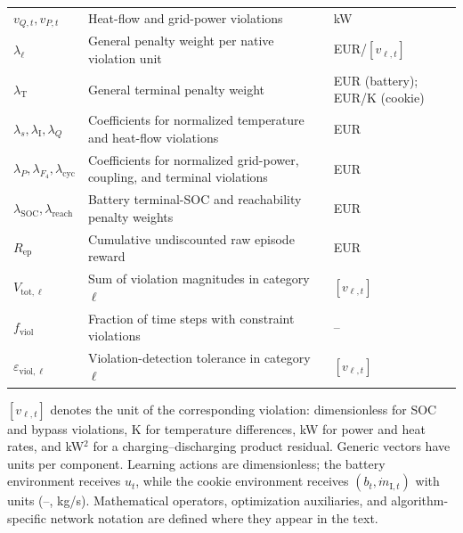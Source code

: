 \begin{longtable}{@{}p{}>{\raggedright\arraybackslash}p{}>{\raggedright\arraybackslash}p{}@{}}
$v_{Q,t},v_{P,t}$ & Heat-flow and grid-power violations & kW \\
$\lambda_\ell$ & General penalty weight per native violation unit & EUR/$[v_{\ell,t}]$ \\
$\lambda_{\mathrm T}$ & General terminal penalty weight & EUR (battery); EUR/K (cookie) \\
$\lambda_s,\lambda_{\mathrm I},\lambda_Q$ & Coefficients for normalized temperature and heat-flow violations & EUR \\
$\lambda_P,\lambda_{F_4},\lambda_{\mathrm{cyc}}$ & Coefficients for normalized grid-power, coupling, and terminal violations & EUR \\
$\lambda_{\mathrm{SOC}},\lambda_{\mathrm{reach}}$ & Battery terminal-SOC and reachability penalty weights & EUR \\
$R_{\mathrm{ep}}$ & Cumulative undiscounted raw episode reward & EUR \\
$V_{\mathrm{tot},\ell}$ & Sum of violation magnitudes in category $\ell$ & $[v_{\ell,t}]$ \\
$f_{\mathrm{viol}}$ & Fraction of time steps with constraint violations & -- \\
$\varepsilon_{\mathrm{viol},\ell}$ & Violation-detection tolerance in category $\ell$ & $[v_{\ell,t}]$ \\
\end{longtable}
\noindent $[v_{\ell,t}]$ denotes the unit of the corresponding violation:
dimensionless for SOC and bypass violations, K for temperature differences,
kW for power and heat rates, and kW$^2$ for a charging--discharging product
residual. Generic vectors have units per component. Learning actions are
dimensionless; the battery environment receives $u_t$, while the cookie
environment receives $(b_t,\dot m_{\mathrm I,t})$ with units (--, kg/s).
Mathematical operators,
optimization auxiliaries, and algorithm-specific network notation are
defined where they appear in the text.
\endgroup
